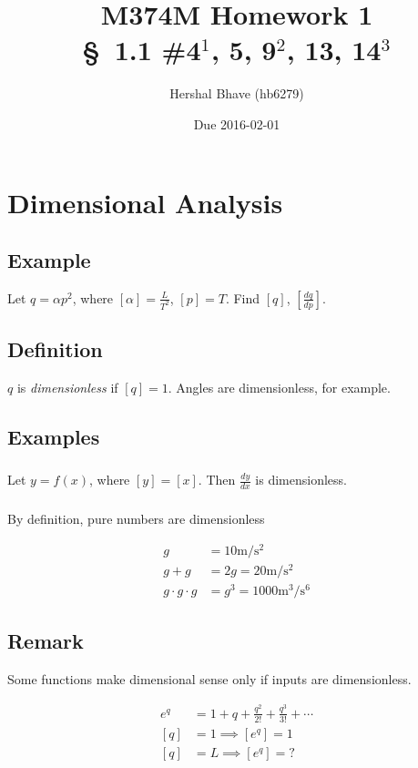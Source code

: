 \documentclass[12pt]{article}
\title{M374M Homework 1 \\
  \normalsize{\S~1.1 \#4$^1$, 5, 9$^2$, 13, 14$^3$}}
\author{Hershal Bhave (hb6279)}
\date{Due 2016-02-01}
\begin{document}
\tableofcontents

\section{Dimensional Analysis}
\subsection{Example}
Let $q = \alpha p^2$, where $[\alpha] = \frac{L}{T^2}$, $[p] = T$. Find $[q]$,
$\left[\frac{dq}{dp}\right]$.

\subsection{Definition}
$q$ is \emph{dimensionless} if $[q] = 1$. Angles are dimensionless, for example.

\subsection{Examples}
\subsubsection{}
Let $y = f(x)$, where $[y] = [x]$. Then $\frac{dy}{dx}$ is dimensionless.

\subsubsection{}
By definition, pure numbers are dimensionless

\begin{equation}
  \begin{aligned}
    g &= 10 \text{m}/\text{s}^2 \\
    g + g &= 2g = 20 \text{m}/\text{s}^2 \\
    g \cdot g \cdot g & = g^3 = 1000 \text{m}^3/\text{s}^6
  \end{aligned}
\end{equation}

\subsection{Remark}
Some functions make dimensional sense only if inputs are dimensionless.

\begin{equation}
  \begin{aligned}
    e^q &= 1 + q + \frac{q^2}{2!} + \frac{q^3}{3!} + \cdots \\
    [q] &= 1 \implies [e^q] = 1 \\
    [q] &= L \implies [e^q] = ?
  \end{aligned}
\end{equation}
\end{document}
